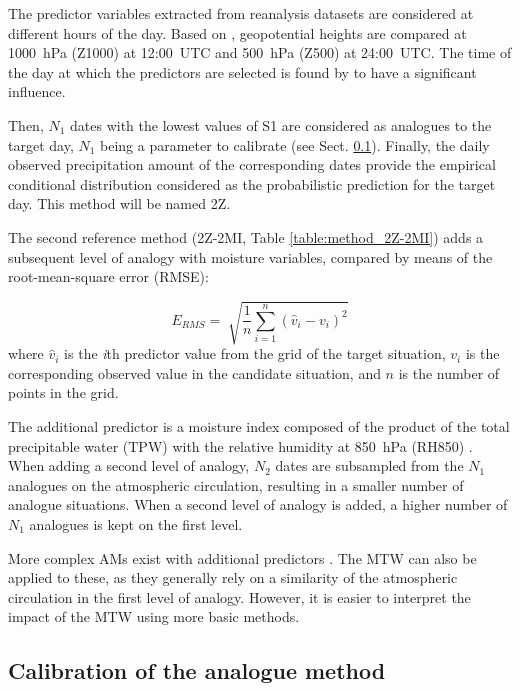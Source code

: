 \documentclass[hess, manuscript]{copernicus}
\begin{document}
	The predictor variables extracted from reanalysis datasets are considered at different hours of the day. Based on \citet{Bontron2005}, geopotential heights are compared at 1000~hPa (Z1000) at 12:00~UTC and 500~hPa (Z500) at 24:00~UTC. The time of the day at which the predictors are selected is found by \citet{Bontron2004} to have a significant influence.
	
	Then, $N_{1}$ dates with the lowest values of S1 are considered as analogues to the target day, $N_{1}$ being a parameter to calibrate (see Sect. \ref{sec:calibration}). Finally, the daily observed precipitation amount of the corresponding dates provide the empirical conditional distribution considered as the probabilistic prediction for the target day. This method will be named 2Z.
	
	The second reference method (2Z-2MI, Table \ref{table:method_2Z-2MI}) adds a subsequent level of analogy with moisture variables, compared by means of the root-mean-square error (RMSE):
	
	\begin{equation}
	\label{eq:RMSE}
	E_{RMS}= \sqrt[]{ \frac{1}{n} \sum_{i=1}^{n}(\hat{v}_{i} - v_{i})^{2}} 
	\end{equation}
	where $\hat{v}_{i}$ is the \textit{i}th predictor value from the grid of the target situation, $v_{i}$ is the corresponding observed value in the candidate situation, and $n$ is the number of points in the grid.
	
	The additional predictor is a moisture index composed of the product of the total precipitable water (TPW) with the relative humidity at 850~hPa (RH850) \citep{Bontron2004}. When adding a second level of analogy, $N_{2}$ dates are subsampled from the $N_{1}$ analogues on the atmospheric circulation, resulting in a smaller number of analogue situations. When a second level of analogy is added, a higher number of $N_{1}$ analogues is kept on the first level.
	
	More complex AMs exist with additional predictors \citep[see e.g.][]{Horton2012a, BenDaoud2016, Caillouet2016}. The MTW can also be applied to these, as they generally rely on a similarity of the atmospheric circulation in the first level of analogy. However, it is easier to interpret the impact of the MTW using more basic methods.
	
	
	\subsection{Calibration of the analogue method}
	\label{sec:calibration}
	
\end{document}

